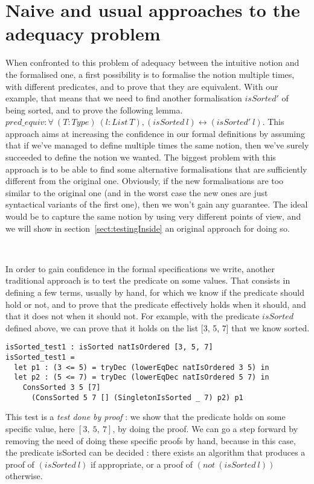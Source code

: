 \section{Naive and usual approaches to the adequacy problem}

\label{sect:naiveApproaches}


When confronted to this problem of adequacy between the intuitive notion and the formalised one, a first possibility is to formalise the notion multiple times, with different predicates, and to prove that they are equivalent.
With our example, that means that we need to find another formalisation $isSorted'$ of being sorted, and to prove the following lemma.
$pred\_equiv : \forall\ (T:Type)\ (l:List\ T), (isSorted\ l) \leftrightarrow (isSorted'\ l)$.
This approach aims at increasing the confidence in our formal definitions by assuming that if we've managed to define multiple times the same notion, then we've surely succeeded to define the notion we wanted. The biggest problem with this approach is to be able to find some alternative formalisations that are sufficiently different from the original one. Obviously, if the new formalisations are too similar to the original one (and in the worst case the new ones are just syntactical variants of the first one), then we won't gain any guarantee. The ideal would be to capture the same notion by using very different points of view, and we will show in section~\ref{sect:testingInside} an original approach for doing so.

\

In order to gain confidence in the formal specifications we write, another traditional approach is to test the predicate on some values. That consists in defining a few terms, usually by hand, for which we know if the predicate should hold or not, and to prove that the predicate effectively holds when it should, and that it does not when it should not. For example, with the predicate $isSorted$ defined above, we can prove that it holds on the list [3, 5, 7] that we know sorted.

\begin{lstlisting}
isSorted_test1 : isSorted natIsOrdered [3, 5, 7]
isSorted_test1 = 
  let p1 : (3 <= 5) = tryDec (lowerEqDec natIsOrdered 3 5) in
  let p2 : (5 <= 7) = tryDec (lowerEqDec natIsOrdered 5 7) in
    ConsSorted 3 5 [7] 
      (ConsSorted 5 7 [] (SingletonIsSorted _ 7) p2) p1
\end{lstlisting}
This test is a \emph{test done by proof} : we show that the predicate holds on some specific value, here $[3,\ 5,\ 7]$, by doing the proof. We can go a step forward by removing the need of doing these specific proofs by hand, because in this case, the predicate isSorted can be decided : there exists an algorithm that produces a proof of $(isSorted\ l)$ if appropriate, or a proof of $(not\ (isSorted\ l))$ otherwise.

